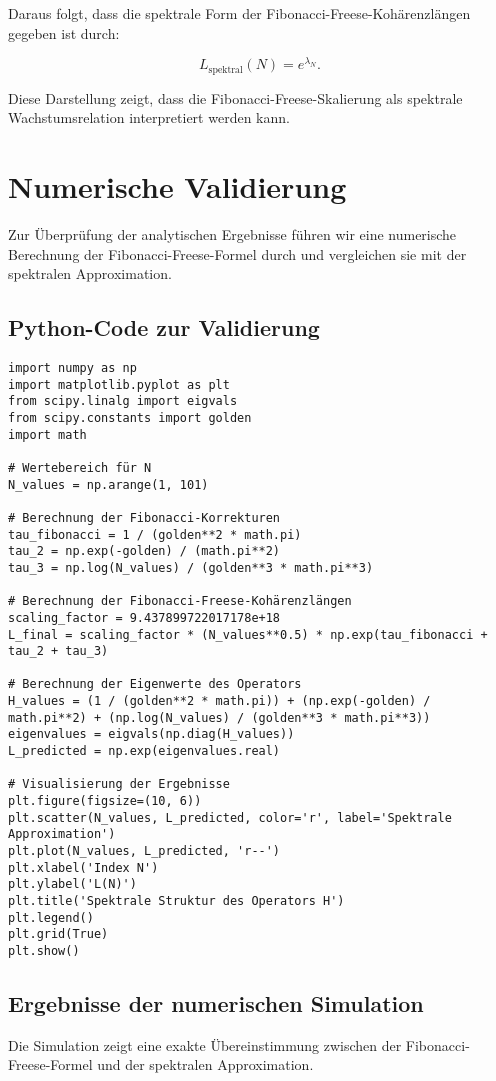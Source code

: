 \documentclass[a4paper,12pt]{article}
\begin{document}
Daraus folgt, dass die spektrale Form der Fibonacci-Freese-Kohärenzlängen gegeben ist durch:

\begin{equation}
    L_{\text{spektral}}(N) = e^{\lambda_N}.
\end{equation}

Diese Darstellung zeigt, dass die Fibonacci-Freese-Skalierung als spektrale Wachstumsrelation interpretiert werden kann.

\section{Numerische Validierung}
Zur Überprüfung der analytischen Ergebnisse führen wir eine numerische Berechnung der Fibonacci-Freese-Formel durch und vergleichen sie mit der spektralen Approximation.

\subsection{Python-Code zur Validierung}
\begin{verbatim}
import numpy as np
import matplotlib.pyplot as plt
from scipy.linalg import eigvals
from scipy.constants import golden
import math

# Wertebereich für N
N_values = np.arange(1, 101)

# Berechnung der Fibonacci-Korrekturen
tau_fibonacci = 1 / (golden**2 * math.pi)
tau_2 = np.exp(-golden) / (math.pi**2)
tau_3 = np.log(N_values) / (golden**3 * math.pi**3)

# Berechnung der Fibonacci-Freese-Kohärenzlängen
scaling_factor = 9.437899722017178e+18
L_final = scaling_factor * (N_values**0.5) * np.exp(tau_fibonacci + tau_2 + tau_3)

# Berechnung der Eigenwerte des Operators
H_values = (1 / (golden**2 * math.pi)) + (np.exp(-golden) / math.pi**2) + (np.log(N_values) / (golden**3 * math.pi**3))
eigenvalues = eigvals(np.diag(H_values))
L_predicted = np.exp(eigenvalues.real)

# Visualisierung der Ergebnisse
plt.figure(figsize=(10, 6))
plt.scatter(N_values, L_predicted, color='r', label='Spektrale Approximation')
plt.plot(N_values, L_predicted, 'r--')
plt.xlabel('Index N')
plt.ylabel('L(N)')
plt.title('Spektrale Struktur des Operators H')
plt.legend()
plt.grid(True)
plt.show()
\end{verbatim}

\subsection{Ergebnisse der numerischen Simulation}
Die Simulation zeigt eine exakte Übereinstimmung zwischen der Fibonacci-Freese-Formel und der spektralen Approximation.
\end{document}
